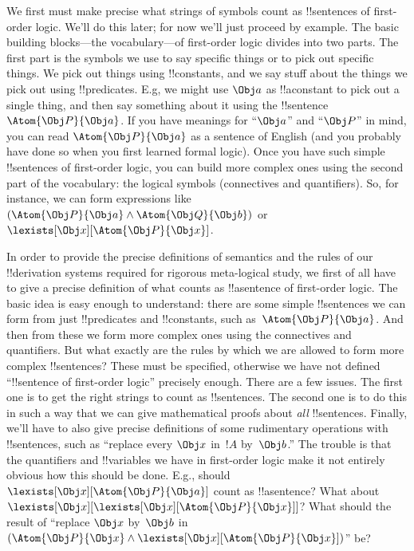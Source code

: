 \documentclass[../../../include/open-logic-section]{subfiles}
\begin{document}

We first must make precise what strings of symbols count as
!!{sentence}s of first-order logic.  We'll do this later; for now
we'll just proceed by example.  The basic building blocks---the
vocabulary---of first-order logic divides into two parts. The first
part is the symbols we use to say specific things or to pick out
specific things. We pick out things using !!{constant}s, and we say
stuff about the things we pick out using !!{predicate}s.  E.g, we
might use $\Obj a$ as !!a{constant} to pick out a single thing, and
then say something about it using the !!{sentence}~$\Atom{\Obj P}{\Obj
a}$.  If you have meanings for ``$\Obj a$'' and ``$\Obj P$'' in mind,
you can read $\Atom{\Obj P}{\Obj a}$ as a sentence of English (and you
probably have done so when you first learned formal logic).  Once you
have such simple !!{sentence}s of first-order logic, you can build
more complex ones using the second part of the vocabulary: the logical
symbols (connectives and quantifiers). So, for instance, we can form
expressions like $(\Atom{\Obj P}{\Obj a} \land \Atom{\Obj Q}{\Obj b})$
or~$\lexists[\Obj x][\Atom{\Obj P}{\Obj x}]$.

In order to provide the precise definitions of semantics and the rules
of our !!{derivation} systems required for rigorous meta-logical study, we
first of all have to give a precise definition of what counts as
!!a{sentence} of first-order logic. The basic idea is easy enough to
understand: there are some simple !!{sentence}s we can form from just
!!{predicate}s and !!{constant}s, such as~$\Atom{\Obj P}{\Obj a}$. And
then from these we form more complex ones using the connectives and
quantifiers. But what exactly are the rules by which we are allowed to
form more complex !!{sentence}s?  These must be specified, otherwise
we have not defined ``!!{sentence} of first-order logic'' precisely
enough. There are a few issues. The first one is to get the right
strings to count as !!{sentence}s. The second one is to do this in
such a way that we can give mathematical proofs about \emph{all}
!!{sentence}s. Finally, we'll have to also give precise definitions of
some rudimentary operations with !!{sentence}s, such as ``replace
every $\Obj x$ in~$!A$ by~$\Obj b$.'' The trouble is that the
quantifiers and !!{variable}s we have in first-order logic make it not
entirely obvious how this should be done. E.g., should $\lexists[\Obj
x][\Atom{\Obj P}{\Obj a}]$ count as !!a{sentence}? What about
$\lexists[\Obj x][\lexists[\Obj x][\Atom{\Obj P}{\Obj x}]]$? What
should the result of ``replace $\Obj x$ by~$\Obj b$ in $(\Atom{\Obj
P}{\Obj x} \land \lexists[\Obj x][\Atom{\Obj P}{\Obj x}])$'' be?
\end{document}
